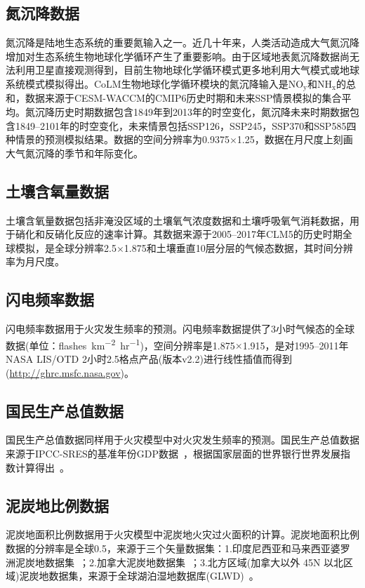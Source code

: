 \subsection{氮沉降数据}\label{氮沉降数据}
氮沉降是陆地生态系统的重要氮输入之一。近几十年来，人类活动造成大气氮沉降增加对生态系统生物地球化学循环产生了重要影响。由于区域地表氮沉降数据尚无法利用卫星直接观测得到，目前生物地球化学循环模式更多地利用大气模式或地球系统模式模拟得出。CoLM生物地球化学循环模块的氮沉降输入是$\mathrm{NO_y}$和$\mathrm{NH_x}$的总和，数据来源于CESM-WACCM的CMIP6历史时期和未来SSP情景模拟的集合平均。氮沉降历史时期数据包含1849年到2013年的时空变化，氮沉降未来时期数据包含1849--2101年的时空变化，未来情景包括SSP126，SSP245，SSP370和SSP585四种情景的预测模拟结果。数据的空间分辨率为0.9375\textdegree$\times$1.25\textdegree，数据在月尺度上刻画大气氮沉降的季节和年际变化。


\subsection{土壤含氧量数据}\label{土壤含氧量数据}
土壤含氧量数据包括非淹没区域的土壤氧气浓度数据和土壤呼吸氧气消耗数据，用于硝化和反硝化反应的速率计算。其数据来源于2005--2017年CLM5的历史时期全球模拟，是全球分辨率2.5\textdegree$\times$1.875\textdegree 和土壤垂直10层分层的气候态数据，其时间分辨率为月尺度。


\subsection{闪电频率数据}\label{闪电频率数据}
闪电频率数据用于火灾发生频率的预测。闪电频率数据提供了3小时气候态的全球数据(单位：\unit{flashes. km^{-2}.hr^{-1}})，空间分辨率是1.875\textdegree$\times$1.915\textdegree，是对1995--2011年NASA LIS/OTD 2小时2.5\textdegree{}格点产品(版本v2.2)进行线性插值而得到(\url{http://ghrc.msfc.nasa.gov})。


\subsection{国民生产总值数据}\label{国民生产总值数据}
国民生产总值数据同样用于火灾模型中对火灾发生频率的预测。国民生产总值数据来源于IPCC-SRES的基准年份GDP数据~\citep{van2007downscaling}，根据国家层面的世界银行世界发展指数计算得出~\citep{WorldBank2004,UNSTAT2005}。


\subsection{泥炭地比例数据}\label{泥炭地比例数据}
泥炭地面积比例数据用于火灾模型中泥炭地火灾过火面积的计算。泥炭地面积比例数据的分辨率是全球0.5\textdegree，来源于三个矢量数据集：1.印度尼西亚和马来西亚婆罗洲泥炭地数据集~\citep{olson2001terrestrial}；2.加拿大泥炭地数据集~\citep{tarnocai2000peatlands}；3.北方区域(加拿大以外 45\textdegree N 以北区域)泥炭地数据集，来源于全球湖泊湿地数据库(GLWD)~\citep{lehner2004development}。


